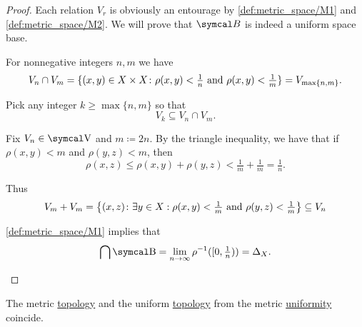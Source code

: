 \begin{proof}
  Each relation \( V_r \) is obviously an entourage by \ref{def:metric_space/M1} and \ref{def:metric_space/M2}. We will prove that \( \Cal{B} \) is indeed a uniform space base.

  \begin{description}
     For nonnegative integers \( n, m \) we have
    \begin{equation*}
      V_n \cap V_m
      =
      \{ (x, y) \in X \times X \colon \rho(x, y) < \tfrac 1 n \text{ and } \rho(x, y) < \tfrac 1 m \}
      =
      V_{\max\{ n, m \}}.
    \end{equation*}

    Pick any integer \( k \geq \max\{ n, m \} \) so that
    \begin{equation*}
      V_k \subseteq V_n \cap V_m.
    \end{equation*}

     Fix \( V_n \in \CV \) and \( m \coloneqq 2n \). By the triangle inequality, we have that if \( \rho(x, y) < m \) and \( \rho(y, z) < m \), then
    \begin{equation*}
       \rho(x, z) \leq \rho(x, y) + \rho(y, z) < \tfrac 1 m + \tfrac 1 m = \tfrac 1 n.
    \end{equation*}

    Thus
    \begin{equation*}
      V_m + V_m
      =
      \left\{ (x, z) \colon \exists y \in X: \rho(x, y) < \tfrac 1 m \text{ and } \rho(y, z) < \tfrac 1 m \right\}
      \subseteq
      V_n
    \end{equation*}

     \ref{def:metric_space/M1} implies that
    \begin{equation*}
      \bigcap \CB = \lim_{n \to \infty} \rho^{-1}([0, \tfrac 1 n)) = \Delta_X.
    \end{equation*}
  \end{description}
\end{proof}

\begin{proposition}\label{thm:metric_topology_coincides_with_uniform_topology}
  The metric \hyperref[def:metric_topology]{topology} and the uniform \hyperref[def:uniform_topology]{topology} from the metric \hyperref[def:metric_uniformity]{uniformity} coincide.
\end{proposition}

